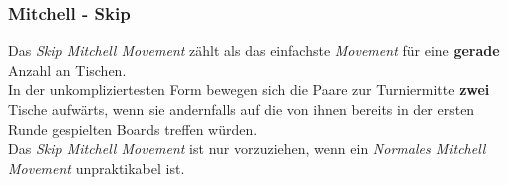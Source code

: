 \subsubsection{Mitchell - Skip}

\noindent
Das \textit{Skip Mitchell Movement} zählt als das einfachste \textit{Movement} für eine \textbf{gerade} Anzahl an Tischen.\\[.1cm]

\noindent
In der unkompliziertesten Form bewegen sich die \ew Paare zur Turniermitte \textbf{zwei} Tische aufwärts, wenn sie andernfalls auf die von ihnen bereits in der ersten Runde gespielten Boards treffen würden.\\[.1cm]

\noindent
Das \textit{Skip Mitchell Movement} ist nur vorzuziehen, wenn ein \textit{Normales Mitchell Movement} unpraktikabel ist.


\noindent

